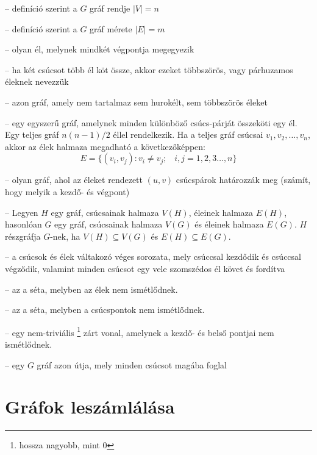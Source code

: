 \begin{description}
	\setlength{\itemsep}{0.04mm}
	\item[rend] -- definíció szerint a \(G\) gráf rendje \(|V| = n\)
	\item[méret] -- definíció szerint a \(G\) gráf mérete \(|E| = m\)
	\item[hurokél] -- olyan él, melynek mindkét végpontja megegyezik
	\item[többszörös él] -- ha két csúcsot több él köt össze, akkor ezeket többszörös, vagy párhuzamos éleknek nevezzük
	\item[egyszerű gráf] -- azon gráf, amely nem tartalmaz sem hurokélt, sem többszörös éleket
	\item[teljes gráf] -- egy egyszerű gráf, amelynek minden különböző csúcs-párját összeköti egy él. Egy teljes gráf \(n(n-1)/2\) éllel rendelkezik. Ha a teljes gráf csúcsai \(v_1, v_2, \ldots, v_n\), akkor az élek halmaza megadható a következőképpen:
	\begin{equation}
	E = \{(v_i,v_j): v_i \neq v_j;\;\;\;i,j = 1,2,3\dots, n\}
	\end{equation}
	\item[irányított gráf] -- olyan gráf, ahol az éleket rendezett \((u,v)\) csúcspárok határozzák meg (számít, hogy melyik a kezdő- és végpont)
	\item[részgráf] -- Legyen \(H\) egy gráf, csúcsainak halmaza \(V(H)\), éleinek halmaza \(E(H)\), hasonlóan \(G\) egy gráf, csúcsainak halmaza \(V(G)\) és éleinek halmaza \(E(G)\). \(H\) részgráfja \(G\)-nek, ha \(V(H) \subseteq V(G)\) és \(E(H) \subseteq E(G)\).
	\item[séta] -- a csúcsok és élek váltakozó véges sorozata, mely csúccsal kezdődik és csúccsal végződik, valamint minden csúcsot egy vele szomszédos él követ és fordítva
	\item[vonal] -- az a séta, melyben az élek nem ismétlődnek.
	\item[út] -- az a séta, melyben a csúcspontok nem ismétlődnek.
	\item[kör] -- egy nem-triviális%
	\footnote{ %
		hossza nagyobb, mint 0
	}  %
 zárt vonal, amelynek a kezdő- és belső pontjai nem ismétlődnek.
	\item[Hamilton-út] -- egy \(G\) gráf azon útja, mely minden csúcsot magába foglal
\end{description}


\section{Gráfok leszámlálása}\label{sec:ALAP:adatelem}

